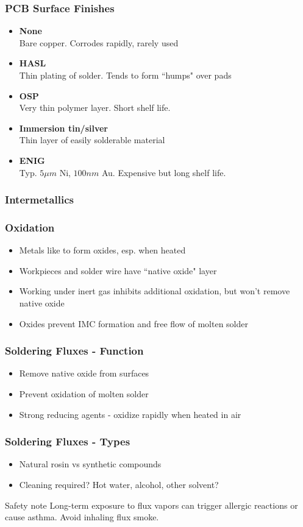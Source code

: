 \documentclass{beamer}
\begin{document}
\begin{frame}
\frametitle{PCB Surface Finishes}
\begin{itemize}
\item \textbf{None}\\
Bare copper. Corrodes rapidly, rarely used
\item \textbf{HASL} \\
Thin plating of solder. Tends to form ``humps" over pads
\item \textbf{OSP} \\
Very thin polymer layer. Short shelf life.
\item \textbf{Immersion tin/silver} \\
Thin layer of easily solderable material
\item \textbf{ENIG} \\
Typ. $5 \mu m$ Ni, $100 nm$ Au. Expensive but long shelf life.
\end{itemize}
\end{frame}

\begin{frame}
\frametitle{Intermetallics}
\end{frame}

\begin{frame}
\frametitle{Oxidation}
\begin{itemize}
\item Metals like to form oxides, esp. when heated
\item Workpieces and solder wire have ``native oxide" layer
\item Working under inert gas inhibits additional oxidation, but won't remove native oxide
\item Oxides prevent IMC formation and free flow of molten solder
\end{itemize}
\end{frame}

\begin{frame}
\frametitle{Soldering Fluxes - Function}
\begin{itemize}
\item Remove native oxide from surfaces
\item Prevent oxidation of molten solder
\item Strong reducing agents - oxidize rapidly when heated in air
\end{itemize}
\end{frame}

\begin{frame}
\frametitle{Soldering Fluxes - Types}
\begin{itemize}
\item Natural rosin vs synthetic compounds
\item Cleaning required? Hot water, alcohol, other solvent?
\end{itemize}
\begin{alertblock}{Safety note}
Long-term exposure to flux vapors can trigger allergic reactions or cause asthma. Avoid inhaling flux smoke.
\end{alertblock}
\end{frame}
\end{document}
